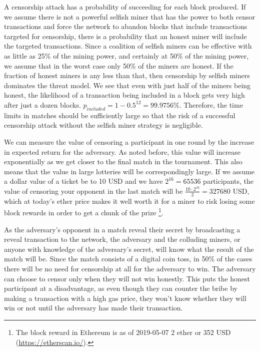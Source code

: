 A censorship attack has a probability of succeeding for each block produced. If we assume there is not a powerful selfish miner that has the power to both censor transactions and force the network to abandon blocks that include transactions targeted for censorship, there is a probability that an honest miner will include the targeted transactions. Since a coalition of selfish miners can be effective with as little as 25\% of the mining power, and certainly at 50\% of the mining power, we assume that in the worst case only 50\% of the miners are honest. If the fraction of honest miners is any less than that, then censorship by selfish miners dominates the threat model. We see that even with just half of the miners being honest, the likelihood of a transaction being included in a block gets very high after just a dozen blocks. $p_{included} = 1-0.5^{12}=99.9756\%$. Therefore, the time limits in matches should be sufficiently large so that the risk of a successful censorship attack without the selfish miner strategy is negligible.

We can measure the value of censoring a participant in one round by the increase in expected return for the adversary. As noted before, this value will increase exponentially as we get closer to the final match in the tournament. This also means that the value in large lotteries will be correspondingly large. If we assume a dollar value of a ticket be to 10 USD and we have $2^{16}=65536$ participants, the value of censoring your opponent in the last match will be $\frac{10 \cdot 2^{16}}{2}=327680$ USD, which at today's ether price makes it well worth it for a miner to risk losing some block rewards in order to get a chunk of the prize \footnote{The block reward in Ethereum is as of 2019-05-07 2 ether or 352 USD (\url{https://etherscan.io/}).}.

As the adversary's opponent in a match reveal their secret by broadcasting a reveal transaction to the network, the adversary and the colluding miners, or anyone with knowledge of the adversary's secret, will know what the result of the match will be. Since the match consists of a digital coin toss, in 50\% of the cases there will be no need for censorship at all for the adversary to win. The adversary can choose to censor only when they will not win honestly. This puts the honest participant at a disadvantage, as even though they can counter the bribe by making a transaction with a high gas price, they won't know whether they will win or not until the adversary has made their transaction.

